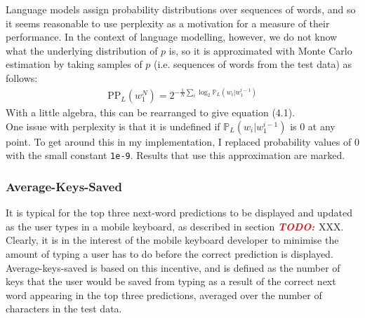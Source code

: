 \documentclass[a4paper, 12pt]{report}
\newcommand{\todo}{\textbf{\textit{\textcolor{red}{TODO: }}}}
\newcommand{\ttt}[1]{\texttt{#1}}
\begin{document}
Language models assign probability distributions over sequences of words, and so it seems reasonable to use perplexity as a motivation for a measure of their performance. In the context of language modelling, however, we do not know what the underlying distribution of $p$ is, so it is approximated with Monte Carlo estimation by taking samples of $p$ (i.e. sequences of words from the test data) as follows:
\begin{gather*}
	\text{PP}_L(w_1^N) = 2^{-\frac{1}{N}\sum_i \log_2 \mathbb{P}_L(w_i | w_1^{i-1})}
\end{gather*}
With a little algebra, this can be rearranged to give equation (4.1). \\

One issue with perplexity is that it is undefined if $\mathbb{P}_L(w_i | w_1^{i-1})$ is 0 at any point. To get around this in my implementation, I replaced probability values of 0 with the small constant \ttt{1e-9}. Results that use this approximation are marked.

%

\subsubsection{Average-Keys-Saved}

It is typical for the top three next-word predictions to be displayed and updated as the user types in a mobile keyboard, as described in section \todo{XXX}. Clearly, it is in the interest of the mobile keyboard developer to minimise the amount of typing a user has to do before the correct prediction is displayed. Average-keys-saved is based on this incentive, and is defined as the number of keys that the user would be saved from typing as a result of the correct next word appearing in the top three predictions, averaged over the number of characters in the test data. \\
\end{document}
